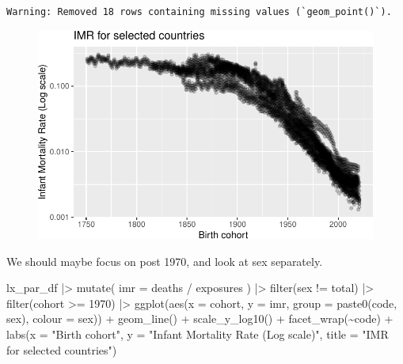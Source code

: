 \documentclass[
  letterpaper,
  DIV=11,
  numbers=noendperiod]{scrartcl}
\newenvironment{Shaded}{\begin{snugshade}}{\end{snugshade}}
\newcommand{\AttributeTok}[1]{\textcolor[rgb]{0.40,0.45,0.13}{#1}}
\newcommand{\DecValTok}[1]{\textcolor[rgb]{0.68,0.00,0.00}{#1}}
\newcommand{\FunctionTok}[1]{\textcolor[rgb]{0.28,0.35,0.67}{#1}}
\newcommand{\NormalTok}[1]{\textcolor[rgb]{0.00,0.23,0.31}{#1}}
\newcommand{\SpecialCharTok}[1]{\textcolor[rgb]{0.37,0.37,0.37}{#1}}
\newcommand{\StringTok}[1]{\textcolor[rgb]{0.13,0.47,0.30}{#1}}
\begin{document}
\begin{verbatim}
Warning: Removed 18 rows containing missing values (`geom_point()`).
\end{verbatim}

\begin{figure}[H]

{\centering \includegraphics{main_notebook_files/figure-pdf/unnamed-chunk-4-1.pdf}

}

\end{figure}

We should maybe focus on post 1970, and look at sex separately.

\begin{Shaded}
\begin{Highlighting}[]
\NormalTok{lx\_par\_df }\SpecialCharTok{|\textgreater{}} 
  \FunctionTok{mutate}\NormalTok{(}
    \AttributeTok{imr =}\NormalTok{ deaths }\SpecialCharTok{/}\NormalTok{ exposures}
\NormalTok{  ) }\SpecialCharTok{|\textgreater{}} 
  \FunctionTok{filter}\NormalTok{(sex }\SpecialCharTok{!=} \StringTok{\textquotesingle{}total\textquotesingle{}}\NormalTok{) }\SpecialCharTok{|\textgreater{}} 
  \FunctionTok{filter}\NormalTok{(cohort }\SpecialCharTok{\textgreater{}=} \DecValTok{1970}\NormalTok{) }\SpecialCharTok{|\textgreater{}} 
  \FunctionTok{ggplot}\NormalTok{(}\FunctionTok{aes}\NormalTok{(}\AttributeTok{x =}\NormalTok{ cohort, }\AttributeTok{y =}\NormalTok{ imr, }\AttributeTok{group =} \FunctionTok{paste0}\NormalTok{(code, sex), }\AttributeTok{colour =}\NormalTok{ sex)) }\SpecialCharTok{+} 
  \FunctionTok{geom\_line}\NormalTok{() }\SpecialCharTok{+}
  \FunctionTok{scale\_y\_log10}\NormalTok{() }\SpecialCharTok{+} 
  \FunctionTok{facet\_wrap}\NormalTok{(}\SpecialCharTok{\textasciitilde{}}\NormalTok{code) }\SpecialCharTok{+} 
  \FunctionTok{labs}\NormalTok{(}\AttributeTok{x =} \StringTok{"Birth cohort"}\NormalTok{, }\AttributeTok{y =} \StringTok{"Infant Mortality Rate (Log scale)"}\NormalTok{,}
       \AttributeTok{title =} \StringTok{"IMR for selected countries"}\NormalTok{)}
\end{Highlighting}
\end{Shaded}
\end{document}
